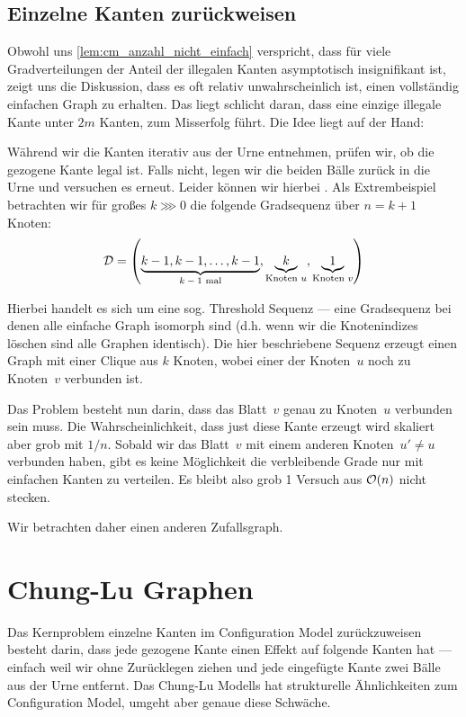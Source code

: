 \subsection{Einzelne Kanten zurückweisen}
Obwohl uns \cref{lem:cm_anzahl_nicht_einfach} verspricht, dass für viele Gradverteilungen der Anteil der illegalen Kanten asymptotisch insignifikant ist, zeigt uns die Diskussion, dass es oft relativ unwahrscheinlich ist, einen vollständig einfachen Graph zu erhalten.
Das liegt schlicht daran, dass eine einzige illegale Kante unter $2m$ Kanten, zum Misserfolg führt.
Die Idee liegt auf der Hand:

Während wir die Kanten iterativ aus der Urne entnehmen, prüfen wir, ob die gezogene Kante legal ist.
Falls nicht, legen wir die beiden Bälle zurück in die Urne und versuchen es erneut.
Leider können wir hierbei .
Als Extrembeispiel betrachten wir für großes $k \ggg 0$ die folgende Gradsequenz über $n = k + 1$ Knoten:
\begin{align}
    \mathcal{D} = \left(
    \underbrace{k-1, k-1, \ldots, k-1}_\text{$k-1$ mal},
    \underbrace{k}_\text{Knoten $u$},
    \underbrace{1}_\text{Knoten $v$}
    \right)
\end{align}

Hierbei handelt es sich um eine sog. Threshold Sequenz --- eine Gradsequenz bei denen alle einfache Graph isomorph sind (d.h. wenn wir die Knotenindizes löschen sind alle Graphen identisch).
Die hier beschriebene Sequenz erzeugt einen Graph mit einer Clique aus $k$ Knoten, wobei einer der Knoten~$u$ noch zu Knoten~$v$ verbunden ist.

Das Problem besteht nun darin, dass das Blatt~$v$ genau zu Knoten~$u$ verbunden sein muss.
Die Wahrscheinlichkeit, dass just diese Kante erzeugt wird skaliert aber grob mit $1/n$.
Sobald wir das Blatt~$v$ mit einem anderen Knoten~$u' \ne u$ verbunden haben, gibt es keine Möglichkeit die verbleibende Grade nur mit einfachen Kanten zu verteilen.
Es bleibt also grob 1 Versuch aus $\mathcal{O}\!\left(n\right)$ nicht stecken.

Wir betrachten daher einen anderen Zufallsgraph.

\section{Chung-Lu Graphen}
Das Kernproblem einzelne Kanten im Configuration Model zurückzuweisen besteht darin, dass jede gezogene Kante einen Effekt auf folgende Kanten hat ---
einfach weil wir ohne Zurücklegen ziehen und jede eingefügte Kante zwei Bälle aus der Urne entfernt.
Das Chung-Lu Modells hat strukturelle Ähnlichkeiten zum Configuration Model, umgeht aber genaue diese Schwäche.

